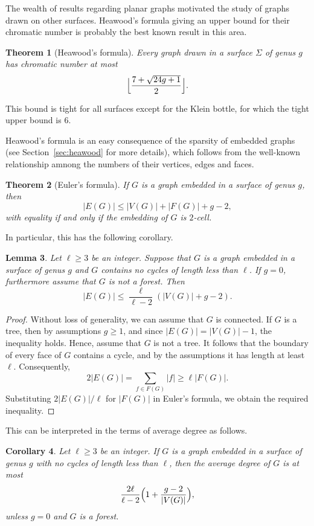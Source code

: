 \documentclass[12pt,twoside,openright,a4paper]{book}
\newtheorem{theorem}{Theorem}[chapter]
\newtheorem{lemma}[theorem]{Lemma}
\newtheorem{corollary}[theorem]{Corollary}
\begin{document}
The wealth of results regarding planar graphs motivated the study of graphs drawn on other surfaces.
Heawood's formula giving an upper bound for their chromatic number is probably the best known result in this area.
\begin{theorem}[Heawood's formula]
Every graph drawn in a surface $\Sigma$ of genus $g$ has chromatic number at most
$$\Bigl\lfloor\frac{7+\sqrt{24g+1}}{2}\Bigr\rfloor.$$
\end{theorem}
This bound is tight for all surfaces except for the Klein bottle, for which the tight upper bound is $6$.

Heawood's formula is an easy consequence of the sparsity of embedded graphs (see Section~\ref{sec:heawood}
for more details), which follows from the well-known relationship amnong the numbers of their vertices, edges and faces.

\begin{theorem}[Euler's formula]\label{thm:eulerfla}
If $G$ is a graph embedded in a surface of genus $g$, then
$$|E(G)|\le |V(G)|+|F(G)|+g-2,$$
with equality if and only if the embedding of $G$ is $2$-cell.
\end{theorem}

In particular, this has the following corollary.
\begin{lemma}\label{lemma:numedges}
Let $\ell\ge 3$ be an integer.
Suppose that $G$ is a graph embedded in a surface of genus $g$ and $G$ contains no cycles of length less than $\ell$.
If $g=0$, furthermore assume that $G$ is not a forest. Then
$$|E(G)|\le \frac{\ell}{\ell-2}(|V(G)|+g-2).$$
\end{lemma}
\begin{proof}
Without loss of generality, we can assume that $G$ is connected.  If $G$ is a tree, then by assumptions
$g\ge 1$, and since $|E(G)|=|V(G)|-1$, the inequality holds.
Hence, assume that $G$ is not a tree.  It follows that the boundary
of every face of $G$ contains a cycle, and by the assumptions it has length at least $\ell$.
Consequently,
$$2|E(G)|=\sum_{f\in F(G)} |f|\ge \ell|F(G)|.$$
Substituting $2|E(G)|/\ell$ for $|F(G)|$ in Euler's formula, we obtain the required inequality.
\end{proof}

This can be interpreted in the terms of average degree as follows.
\begin{corollary}\label{cor:mad}
Let $\ell\ge 3$ be an integer.
If $G$ is a graph embedded in a surface of genus $g$ with no cycles of length less than $\ell$,
then the average degree of $G$ is at most
$$\frac{2\ell}{\ell-2}\Bigl(1+\frac{g-2}{|V(G)|}\Bigr),$$
unless $g=0$ and $G$ is a forest.
\end{corollary}
\end{document}
